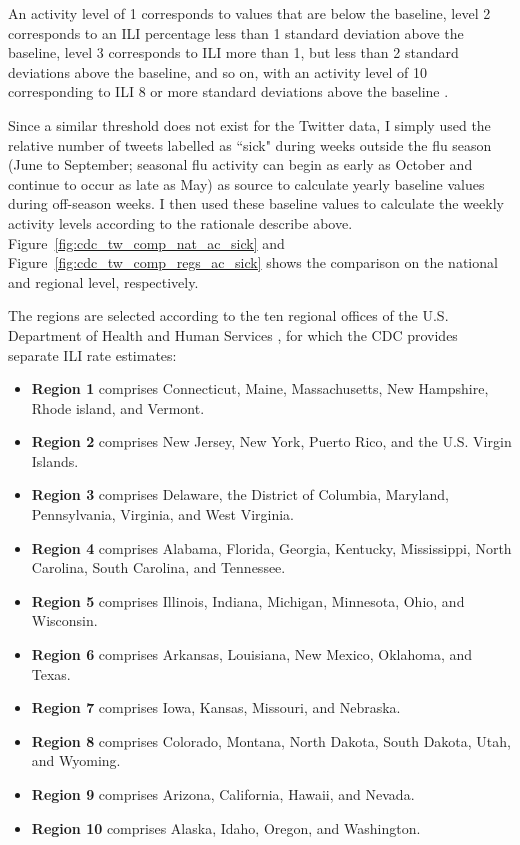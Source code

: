 \documentclass[11pt, a4paper,twoside]{report}\usepackage[]{graphicx}\usepackage[]{color}
\begin{document}
An activity level of 1 corresponds to values that are below the baseline, level 2 corresponds to an ILI percentage less than 1 standard deviation above the baseline, level 3 corresponds to ILI more than 1, but less than 2 standard deviations above the baseline, and so on, with an activity level of 10 corresponding to ILI 8 or more standard deviations above the baseline \citep{cdc_surveillance_2016}.
  
Since a similar threshold does not exist for the Twitter data, I simply used the relative number of tweets labelled as ``sick" during weeks outside the flu season (June to September; seasonal flu activity can begin as early as October and continue to occur as late as May) as source to calculate yearly baseline values during off-season weeks. I then used these baseline values to calculate the weekly activity levels according to the rationale describe above. Figure~\ref{fig:cdc_tw_comp_nat_ac_sick} and Figure~\ref{fig:cdc_tw_comp_regs_ac_sick} shows the comparison on the national and regional level, respectively.\clearpage

The regions are selected according to the ten regional offices of the U.S. Department of Health and Human Services \citep{hhs_offices_2014}, for which the CDC provides separate ILI rate estimates: 

\begin{itemize}
\item \textbf{Region 1} comprises Connecticut, Maine, Massachusetts, New Hampshire, Rhode island, and Vermont.
\item \textbf{Region 2} comprises New Jersey, New York, Puerto Rico, and the U.S. Virgin Islands.
\item \textbf{Region 3} comprises Delaware, the District of Columbia, Maryland, Pennsylvania, Virginia, and West Virginia.
\item \textbf{Region 4} comprises Alabama, Florida, Georgia, Kentucky, Mississippi, North Carolina, South Carolina, and Tennessee.
\item \textbf{Region 5} comprises Illinois, Indiana, Michigan, Minnesota, Ohio, and Wisconsin.
\item \textbf{Region 6} comprises Arkansas, Louisiana, New Mexico, Oklahoma, and Texas.
\item \textbf{Region 7} comprises Iowa, Kansas, Missouri, and Nebraska.
\item \textbf{Region 8} comprises Colorado, Montana, North Dakota, South Dakota, Utah, and Wyoming.
\item \textbf{Region 9} comprises Arizona, California, Hawaii, and Nevada.
\item \textbf{Region 10} comprises Alaska, Idaho, Oregon, and Washington.
\end{itemize}
\end{document}
